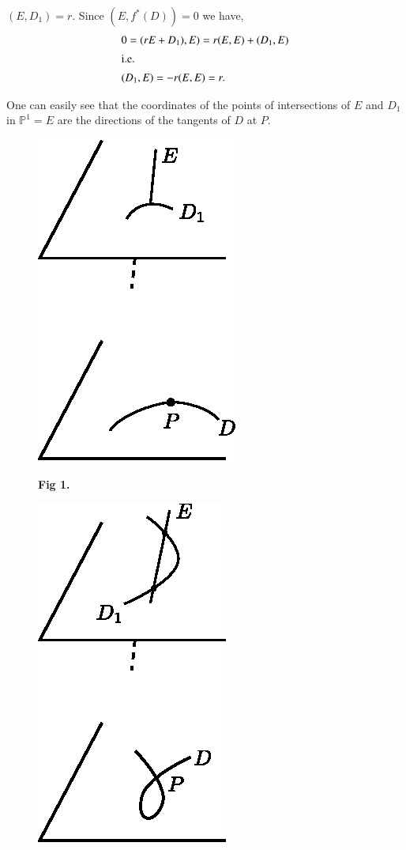 \begin{REM*}
$(E,D_1)=r$. Since $(E,f^*(D))=0$ we have,
\begin{align*}
& 0=(rE+D_1),E)=r(E,E)+(D_1,E)\\
\intertext{{i.e.}\kern.3em}
&(D_1,E)=-r(E,E)=r.
\end{align*}

One can easily see that the coordinates of the points of intersections
of $E$ and $D_1$ in $\mathbb{P}^1=E$ are the directions of the
tangents of $D$ at $P$.\pageoriginale
\begin{center}
\begin{minipage}[b]{5cm}
\begin{figure}[H]
\centering
\includegraphics{figure/fig1.eps}

\medskip
{\bf Fig 1.}
\end{figure}
\end{minipage}
\qquad
\begin{minipage}[b]{5cm}
\begin{figure}[H]
\centering
\includegraphics{figure/fig2.eps}


\end{figure}
\end{minipage}
\end{center}
\end{REM*}
